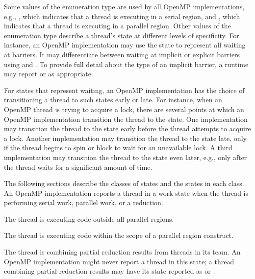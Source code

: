 Some values of the enumeration type  are used by all
OpenMP implementations,
e.g., ,
which indicates that a thread is executing in a serial region, and
,
which indicates that a thread is executing in a parallel region.
Other values of the enumeration type describe a thread's state at
different levels of specificity.
For instance, an OpenMP implementation may use
the state   to represent all
waiting at barriers. It may differentiate between waiting at implicit or explicit barriers using
 and .
To provide full detail about the type of an implicit barrier, a runtime may report
 or
 as appropriate.

For states that represent waiting, an OpenMP implementation has the
choice of transitioning a thread to such states early or late.
For instance, when an OpenMP thread is trying to acquire a lock,
there are several points at which an OpenMP implementation
transition the thread to the  state.
One implementation may transition the thread to the state
early before the thread attempts to acquire a
lock. Another implementation may transition the thread to the state
late, only if the thread begins to spin or
block to wait for an unavailable lock. A third implementation
may transition the thread to the state even later, e.g., only
after the thread waits for a significant amount of time.

The following sections describe the classes of states and the states in each class.
An OpenMP implementation reports a thread in a work state
when the thread is performing serial work, parallel work, or a reduction.

\begin{description}

\item {}

  The thread is executing code outside all parallel regions.

\item {}

  The thread is executing code within the scope of a parallel region construct.

\sloppy
\item {}

  The thread is combining partial reduction results from threads in its team.
  An OpenMP implementation
  might never report a thread in this state; a thread
  combining partial reduction results may have its state reported as
   or .

\end{description}


